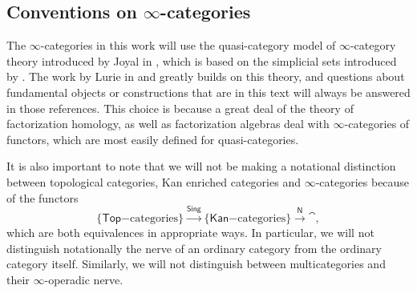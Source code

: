 \documentclass[../text]{subfiles}
\begin{document}
\subsection{Conventions on \texorpdfstring{$\infty$}{infinity}-categories}

The $\infty$-categories in this work will use the quasi-category model of $\infty$-category theory introduced by Joyal in \cite{joyal}, which is based on the simplicial sets introduced by \cite{bv73}. The work by Lurie in \cite{lurie_htt} and \cite{lurie_ha} greatly builds on this theory, and questions about fundamental objects or constructions that are in this text will always be answered in those references. This choice is because a great deal of the theory of factorization homology, as well as factorization algebras deal with $\infty$-categories of functors, which are most easily defined for quasi-categories.

It is also important to note that we will not be making a notational distinction between topological categories, Kan enriched categories and $\infty$-categories because of the functors
%
\begin{equation}
    \{ \mathsf{Top}\mathrm{-categories}\} \xrightarrow{\mathsf{Sing}} \{ \mathsf{Kan}\mathrm{-categories}\} \xrightarrow{\mathsf{N}} \cat,
\end{equation}
%
which are both equivalences in appropriate ways. In particular, we will not distinguish notationally the nerve of an ordinary category from the ordinary category itself. Similarly, we will not distinguish between multicategories and their $\infty$-operadic nerve.
\end{document}

